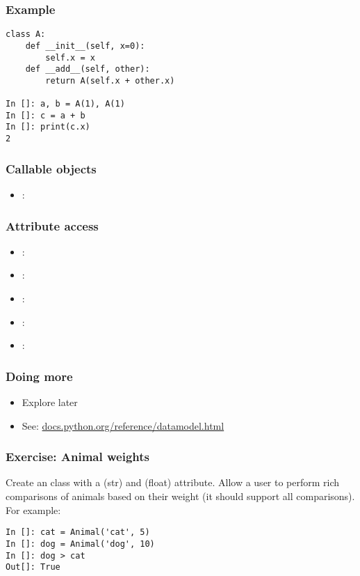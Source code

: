 \documentclass[14pt,compress,aspectratio=169]{beamer}
\begin{document}
\begin{frame}[fragile]
  \frametitle{Example}
\begin{lstlisting}
class A:
    def __init__(self, x=0):
        self.x = x
    def __add__(self, other):
        return A(self.x + other.x)

In []: a, b = A(1), A(1)
In []: c = a + b
In []: print(c.x)
2
\end{lstlisting}
\end{frame}


\begin{frame}[fragile]
  \frametitle{Callable objects}
  \begin{itemize}
  \item {}: 
  \end{itemize}
\end{frame}

\begin{frame}[fragile]
  \frametitle{Attribute access}
  \begin{itemize}
  \item {}: 
  \item {}: 
  \item {}: 
  \item {}: 
  \item {}: 
  \end{itemize}
\end{frame}


\begin{frame}
  \frametitle{Doing more}
  \begin{itemize}
  \item Explore later
  \item See: \url{docs.python.org/reference/datamodel.html}
  \end{itemize}

\end{frame}

\begin{frame}
  \frametitle{Exercise: Animal weights}
  \begin{block}{}
    Create an  class with a  (str) and  (float)
    attribute.  Allow a user to perform rich comparisons of animals based on
    their weight (it should support all comparisons). For example:
  \end{block}

\begin{lstlisting}
In []: cat = Animal('cat', 5)
In []: dog = Animal('dog', 10)
In []: dog > cat
Out[]: True
\end{lstlisting}
\end{frame}
\end{document}

